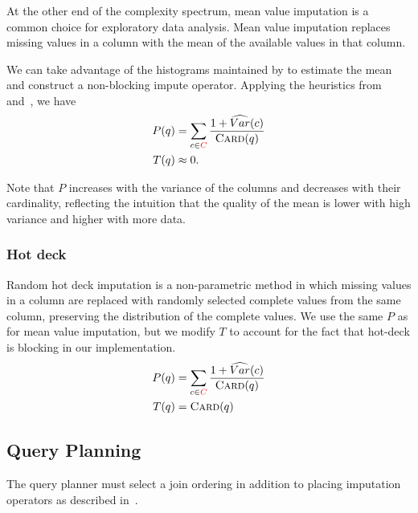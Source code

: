 \subsubsection{}\label{subsubsec:mean}

At the other end of the complexity spectrum, mean value imputation is a common choice for exploratory data analysis.
Mean value imputation replaces missing values in a column with the mean of the available values in that column.

We can take advantage of the histograms maintained by \ProjectName{} to estimate the mean and construct a non-blocking impute operator.
Applying the heuristics from~ and~, we
have
\begin{equation*}
\begin{aligned}
    P(q) &= \sum\limits_{c \in {\color{red}C}} \frac{1+\widehat{Var}(c)}{\textsc{Card}(q)} \\
    T(q) &\approx 0.
\end{aligned}
\end{equation*}

Note that $P$ increases with the variance of the columns and decreases with their cardinality, reflecting the intuition that the quality of the mean is lower with high variance and higher with more data.

\subsubsection{Hot deck}

Random hot deck imputation is a non-parametric method in which missing values in a column are
replaced with randomly selected complete values from the same column, preserving the
distribution of the complete values. We use the same $P$ as for mean value imputation, but
we modify $T$ to account for the fact that hot-deck is blocking in our implementation.  
\begin{equation*}
\begin{aligned}
    P(q) &= \sum\limits_{c \in {\color{red}C}} \frac{1+\widehat{Var}(c)}{\textsc{Card}(q)} \\
    T(q) &= \textsc{Card}(q)
\end{aligned}
\end{equation*}

\subsection{Query Planning}
\label{sec:planning}
The query planner must select a join ordering in addition to placing imputation operators as described in~.

